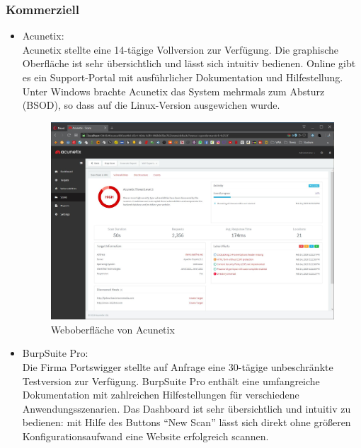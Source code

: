 \documentclass[12pt,oneside,a4paper,parskip]{scrbook}
\begin{document}
    \subsubsection{Kommerziell}
      \begin{itemize}
        \item Acunetix:\\
          Acunetix stellte eine 14-tägige Vollversion zur Verfügung. Die graphische Oberfläche ist sehr übersichtlich und lässt sich intuitiv bedienen. Online gibt es ein Support-Portal mit ausführlicher Dokumentation und Hilfestellung.
          Unter Windows brachte Acunetix das System mehrmals zum Absturz (BSOD), so dass auf die Linux-Version ausgewichen wurde.
          \begin{figure}[H]
            \includegraphics[width=1\textwidth]{Images/Acunetix}
            \caption[Weboberfläche von Acunetix]{Weboberfläche von Acunetix}
          \end{figure}
        \item BurpSuite Pro:\\
          Die Firma Portswigger stellte auf Anfrage eine 30-tägige unbeschränkte Testversion zur Verfügung.
          BurpSuite Pro enthält eine umfangreiche Dokumentation mit zahlreichen Hilfestellungen für verschiedene Anwendungsszenarien.  Das Dashboard ist sehr übersichtlich und intuitiv zu bedienen: mit Hilfe des Buttons ``New Scan'' lässt sich direkt ohne größeren Konfigurationsaufwand eine Website erfolgreich scannen.
          \begin{figure}[H]

\end{figure}
\end{itemize}
\end{document}
